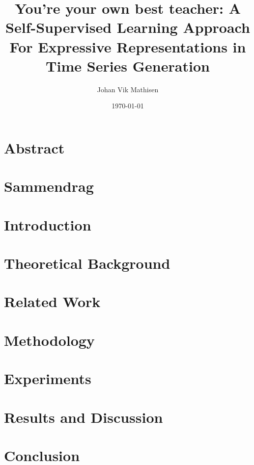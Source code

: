 \documentclass[british,titlepage]{ntnuthesis}
\title{You're your own best teacher: A Self-Supervised Learning Approach For Expressive Representations in Time Series Generation}
\author{Johan Vik Mathisen}
\date{\today}
\begin{document}
\chapter*{Abstract}

\chapter*{Sammendrag}



%

\tableofcontents


\chapter{Introduction}


\chapter{Theoretical Background}


\chapter{Related Work}


\chapter{Methodology}


\chapter{Experiments}


\chapter{Results and Discussion}


\chapter{Conclusion}


\chapter*{\bibname}
\printbibliography[heading=none]

% 

% 
\end{document}

